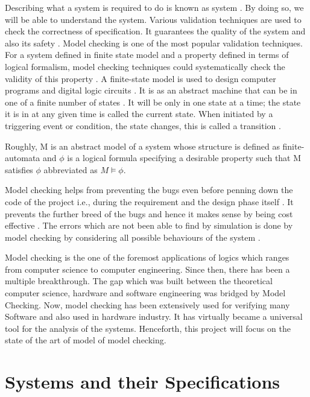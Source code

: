 \documentclass[a4paper,10pt]{report}
\begin{document}
Describing what a system is required to do is known as system \cite{Wang2007}. By doing so, we will be able to understand the system. Various validation techniques are used to check the correctness of specification. It guarantees the quality of the system and also its safety \cite{Clarke1999}. Model checking is one of the most popular validation techniques. For a system defined in finite state model and a property defined in terms of logical formalism, model checking techniques could systematically check the validity of this property \cite{Engler}. A finite-state model is used to design computer programs and digital logic circuits \cite{ErichGamma1995}. It is as an abstract machine that can be in one of a finite number of states \cite{M.Davis1962}. It will be only in one state at a time; the state it is in at any given time is called the current state. When initiated by a triggering event or condition, the state changes, this is called a transition \cite{D.Jackson}.

Roughly, M is an abstract model of a system whose structure is defined as finite-automata and $\phi$  is a logical formula specifying a desirable property such that M satisfies $\phi$  abbreviated as $M \models \phi$. 

Model checking helps from preventing the bugs even before penning down the code of the project i.e., during the requirement and the design phase itself \cite{ErichGamma1995}. It prevents the further breed of the bugs and hence it makes sense by being cost effective \cite{Havelund}. The errors which are not been able to find by simulation is done by model checking by considering all possible behaviours of the system \cite{Havelund}. 

Model checking is the one of the foremost applications of logics which ranges from computer science to computer engineering. Since then, there has been a multiple breakthrough. The gap which was built between the theoretical computer science, hardware and software engineering was bridged by Model Checking. Now, model checking has been extensively used for verifying many Software and also used in hardware industry. It has virtually became a universal tool for the analysis of the systems. Henceforth, this project will focus on the state of the art of model of model checking.

\section{Systems and their Specifications}
\label{Sys and Spec}
\end{document}
